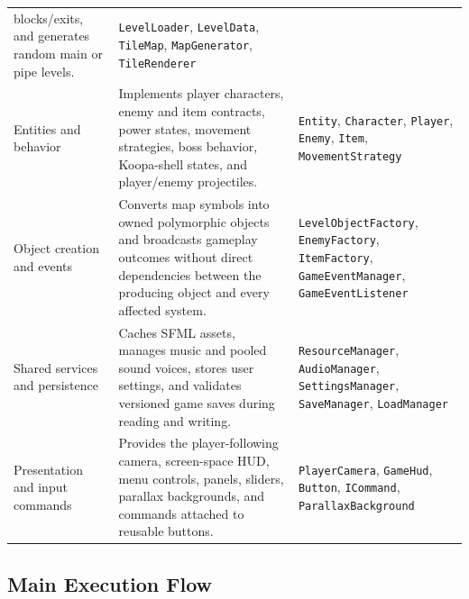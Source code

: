 \documentclass{template}
\begin{document}
\begin{longtable}{@{}>{\raggedright\arraybackslash}p{3.2cm}
                        >{\raggedright\arraybackslash}p{6.1cm}
                        >{\raggedright\arraybackslash}p{5.2cm}@{}}
    blocks/exits, and generates random main or pipe levels. &
    \texttt{LevelLoader}, \texttt{LevelData}, \texttt{TileMap},
    \texttt{MapGenerator}, \texttt{TileRenderer} \\
    Entities and behavior & Implements player characters, enemy and item
    contracts, power states, movement strategies, boss behavior, Koopa-shell
    states, and player/enemy projectiles. & \texttt{Entity},
    \texttt{Character}, \texttt{Player}, \texttt{Enemy}, \texttt{Item},
    \texttt{MovementStrategy} \\
    Object creation and events & Converts map symbols into owned polymorphic
    objects and broadcasts gameplay outcomes without direct dependencies
    between the producing object and every affected system. &
    \texttt{LevelObjectFactory}, \texttt{EnemyFactory}, \texttt{ItemFactory},
    \texttt{GameEventManager}, \texttt{GameEventListener} \\
    Shared services and persistence & Caches SFML assets, manages music and
    pooled sound voices, stores user settings, and validates versioned game
    saves during reading and writing. & \texttt{ResourceManager},
    \texttt{AudioManager}, \texttt{SettingsManager}, \texttt{SaveManager},
    \texttt{LoadManager} \\
    Presentation and input commands & Provides the player-following camera,
    screen-space HUD, menu controls, panels, sliders, parallax backgrounds, and
    commands attached to reusable buttons. & \texttt{PlayerCamera},
    \texttt{GameHud}, \texttt{Button}, \texttt{ICommand},
    \texttt{ParallaxBackground} \\
    \bottomrule
\end{longtable}

\subsection{Main Execution Flow}
\end{document}
